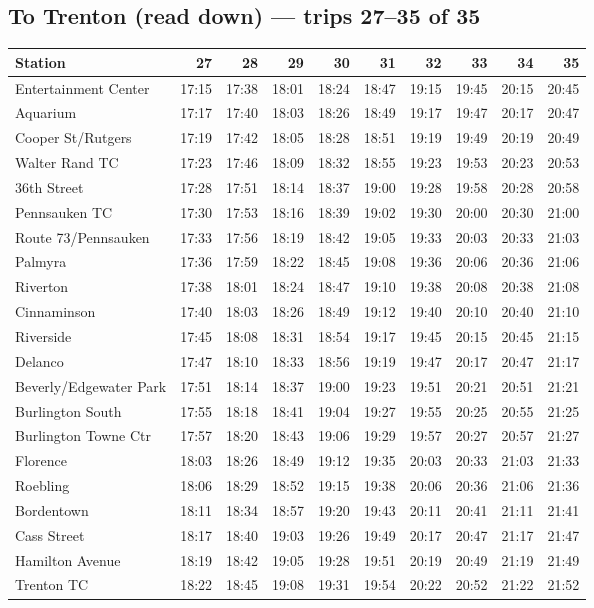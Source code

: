 \subsection*{To Trenton (read down) --- trips 27--35 of 35}
\begin{center}\footnotesize\setlength{\tabcolsep}{3pt}\begin{tabular}{@{}lrrrrrrrrr@{}}\toprule
Station & 27 & 28 & 29 & 30 & 31 & 32 & 33 & 34 & 35 \\\midrule
Entertainment Center & 17:15 & 17:38 & 18:01 & 18:24 & 18:47 & 19:15 & 19:45 & 20:15 & 20:45 \\
Aquarium & 17:17 & 17:40 & 18:03 & 18:26 & 18:49 & 19:17 & 19:47 & 20:17 & 20:47 \\
Cooper St/Rutgers & 17:19 & 17:42 & 18:05 & 18:28 & 18:51 & 19:19 & 19:49 & 20:19 & 20:49 \\
Walter Rand TC & 17:23 & 17:46 & 18:09 & 18:32 & 18:55 & 19:23 & 19:53 & 20:23 & 20:53 \\
36th Street & 17:28 & 17:51 & 18:14 & 18:37 & 19:00 & 19:28 & 19:58 & 20:28 & 20:58 \\
Pennsauken TC & 17:30 & 17:53 & 18:16 & 18:39 & 19:02 & 19:30 & 20:00 & 20:30 & 21:00 \\
Route 73/Pennsauken & 17:33 & 17:56 & 18:19 & 18:42 & 19:05 & 19:33 & 20:03 & 20:33 & 21:03 \\
Palmyra & 17:36 & 17:59 & 18:22 & 18:45 & 19:08 & 19:36 & 20:06 & 20:36 & 21:06 \\
Riverton & 17:38 & 18:01 & 18:24 & 18:47 & 19:10 & 19:38 & 20:08 & 20:38 & 21:08 \\
Cinnaminson & 17:40 & 18:03 & 18:26 & 18:49 & 19:12 & 19:40 & 20:10 & 20:40 & 21:10 \\
Riverside & 17:45 & 18:08 & 18:31 & 18:54 & 19:17 & 19:45 & 20:15 & 20:45 & 21:15 \\
Delanco & 17:47 & 18:10 & 18:33 & 18:56 & 19:19 & 19:47 & 20:17 & 20:47 & 21:17 \\
Beverly/Edgewater Park & 17:51 & 18:14 & 18:37 & 19:00 & 19:23 & 19:51 & 20:21 & 20:51 & 21:21 \\
Burlington South & 17:55 & 18:18 & 18:41 & 19:04 & 19:27 & 19:55 & 20:25 & 20:55 & 21:25 \\
Burlington Towne Ctr & 17:57 & 18:20 & 18:43 & 19:06 & 19:29 & 19:57 & 20:27 & 20:57 & 21:27 \\
Florence & 18:03 & 18:26 & 18:49 & 19:12 & 19:35 & 20:03 & 20:33 & 21:03 & 21:33 \\
Roebling & 18:06 & 18:29 & 18:52 & 19:15 & 19:38 & 20:06 & 20:36 & 21:06 & 21:36 \\
Bordentown & 18:11 & 18:34 & 18:57 & 19:20 & 19:43 & 20:11 & 20:41 & 21:11 & 21:41 \\
Cass Street & 18:17 & 18:40 & 19:03 & 19:26 & 19:49 & 20:17 & 20:47 & 21:17 & 21:47 \\
Hamilton Avenue & 18:19 & 18:42 & 19:05 & 19:28 & 19:51 & 20:19 & 20:49 & 21:19 & 21:49 \\
Trenton TC & 18:22 & 18:45 & 19:08 & 19:31 & 19:54 & 20:22 & 20:52 & 21:22 & 21:52 \\
\bottomrule\end{tabular}\end{center}
